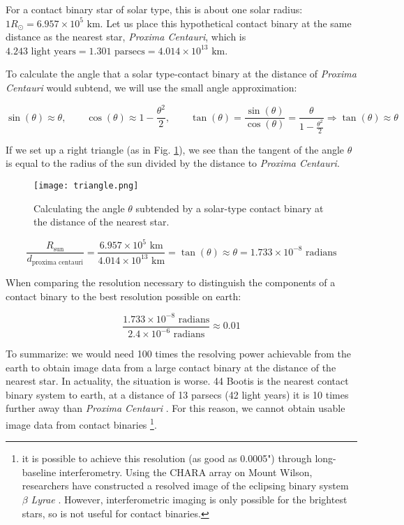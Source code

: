 \documentclass[12pt]{article} %
\numberwithin{equation}{section} %
\begin{document}
For a contact binary star of solar type, this is about one solar radius: $1 R_{\odot} = 6.957 \times 10^{5} \text{ km}$. Let us place this hypothetical contact binary at the same distance as the nearest star, \emph{Proxima Centauri}, which is $4.243 \text{ light years} = 1.301 \text{ parsecs} = 4.014 \times 10^{13} \text{ km}$.

To calculate the angle that a solar type-contact binary at the distance of \emph{Proxima Centauri} would subtend, we will use the small angle approximation:

\begin{equation} \label{eqn: smallangle}
\sin(\theta) \approx \theta, \qquad \cos(\theta) \approx 1 - \frac{\theta^{2}}{2}, \qquad \tan(\theta) = \frac{\sin(\theta)}{\cos(\theta)} = \frac{\theta}{1 - \frac{\theta^{2}}{2}} \Rightarrow \tan(\theta) \approx \theta
\end{equation}

If we set up a right triangle (as in Fig. \ref{fig: triangle}), we see than the tangent of the angle $\theta$ is equal to the radius of the sun divided by the distance to \emph{Proxima Centauri}.

\begin{figure}[H]
\centering
\texttt{[image: triangle.png]}
\caption{Calculating the angle $\theta$ subtended by a solar-type contact binary at the distance of the nearest star.}
\label{fig: triangle}
\end{figure}

\begin{equation} \label{eqn: example_angle}
\frac{R_{\text{sun}}}{d_{\text{proxima centauri}}} = \frac{6.957 \times 10^{5} \text{ km}}{4.014 \times 10^{13} \text{ km}} = \tan(\theta) \approx \theta = 1.733 \times 10^{-8} \text{ radians}
\end{equation}

When comparing the resolution necessary to distinguish the components of a contact binary to the best resolution possible on earth:

\begin{equation} \label{eqn: resolution_comparison}
\frac{1.733 \times 10^{-8} \text{ radians}}{2.4 \times 10^{-6} \text{ radians}} \approx 0.01
\end{equation}

To summarize: we would need 100 times the resolving power achievable from the earth to obtain image data from a large contact binary at the distance of the nearest star. In actuality, the situation is worse. 44 Bootis is the nearest contact binary system to earth, at a distance of 13 parsecs (42 light years) it is 10 times further away than \emph{Proxima Centauri} \citep{eker2008new}. For this reason, we cannot obtain usable image data from contact binaries \footnote{it is possible to achieve this resolution (as good as 0.0005") through long-baseline interferometry. Using the CHARA array on Mount Wilson, researchers have constructed a resolved image of the eclipsing binary system $\beta$ \emph{Lyrae}  \citep{zhao2008first}. However, interferometric imaging is only possible for the brightest stars, so is not useful for contact binaries.}.
\end{document}
